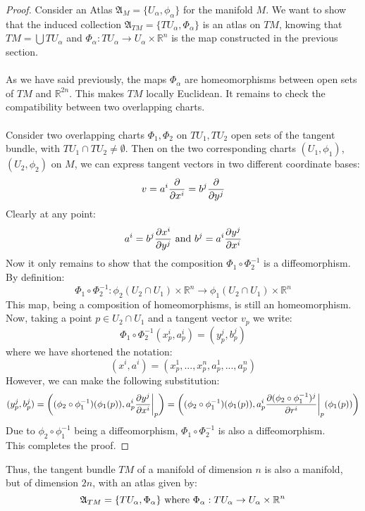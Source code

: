 \documentclass[12pt,a4paper]{report}
\theoremstyle{definition}
\theoremstyle{Theorem}
\theoremstyle{definition}
\theoremstyle{definition}
\begin{document}
	\begin{proof}
		Consider an Atlas $\mathfrak{A}_M=\{U_\alpha,\phi_\alpha\}$ for the manifold $M$. We want to show that the induced collection $\mathfrak{A}_{TM}=\{TU_\alpha,\Phi_\alpha\}$ is an atlas on $TM$, knowing that $TM=\bigcup TU_\alpha$ and $\Phi_\alpha:TU_\alpha\rightarrow U_\alpha\times \mathbb{R}^n$ is the map constructed in the previous section.\\
		\\
		As we have said previously, the maps $\Phi_\alpha$ are homeomorphisms between open sets of $TM$ and $\mathbb{R}^{2n}$. This makes $TM$ locally Euclidean. It remains to check the compatibility between two overlapping charts.\\
		\\
		Consider two overlapping charts $\Phi_1,\Phi_2$ on $TU_1,TU_2$ open sets of the tangent bundle, with $TU_1\cap TU_2\neq \emptyset$. Then on the two corresponding charts $(U_1,\phi_1)$, $(U_2,\phi_2)$ on $M$, we can express tangent vectors in two different coordinate bases:
		$$v=a^i{\partial\over \partial{x^i}}=b^j{\partial \over \partial y^j}$$
		Clearly at any point:
		$$a^i=b^j{\partial x^i\over\partial y^j} \hbox{ and } b^j=a^i{\partial y^j\over\partial x^i}$$
		Now it only remains to show that the composition $\Phi_1\circ \Phi_2^{-1}$ is a diffeomorphism.\\
		By definition:
		$$\Phi_1\circ \Phi_2^{-1}:\phi_2(U_2\cap U_1)\times \mathbb{R}^n\rightarrow \phi_1(U_2\cap U_1)\times \mathbb{R}^n$$
		This map, being a composition of homeomorphisms, is still an homeomorphism. Now, taking a point $p\in U_2\cap U_1$ and a tangent vector $v_p$ we write:
		$$\Phi_1\circ \Phi_2^{-1}(x^i_p,a^i_p)=(y^j_p,b^j_p)$$
		where we have shortened the notation:
		$$(x^i,a^i)=(x^1_p,...,x^n_p,a^1_p,...,a^n_p)$$
		However, we can make the following substitution:
		$$(y^j_p,b^j_p)=\bigg((\phi_2\circ \phi_1^{-1})(\phi_1(p)),a^i_p{\partial y^j\over\partial x^i}\bigg|_p\bigg)=\bigg((\phi_2\circ \phi_1^{-1})(\phi_1(p)),a^i_p{\partial (\phi_2\circ \phi_1^{-1})^j\over\partial r^i}\bigg|_p(\phi_1(p))\bigg)$$
		Due to $\phi_2\circ \phi_1^{-1}$ being a diffeomorphism, $\Phi_1\circ \Phi_2^{-1}$ is also a diffeomorphism.\\
		This completes the proof.
	\end{proof}
	Thus, the tangent bundle $TM$ of a manifold of dimension $n$ is also a manifold, but of dimension $2n$, with an atlas given by:
	$$\mathfrak{A}_{TM}=\{TU_\alpha,\Phi_\alpha\} \hbox{ where } \Phi_\alpha:TU_\alpha\rightarrow U_\alpha\times \mathbb{R}^n$$
\end{document}
